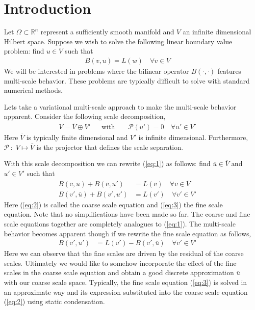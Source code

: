 \section{Introduction}
Let $\Omega \subset \mathbb{R}^n$ represent a sufficiently smooth manifold and $V$ an infinite dimensional Hilbert space. Suppose we wish to solve the following linear boundary value problem: find $u \in V$ such that
\begin{align}
	B(v, u) = L(w)	\quad \forall v \in V \label{eq:1}
\end{align}
We will be interested in problems where the bilinear operator $B(\cdot,\cdot)$ features multi-scale behavior. These problems are typically difficult to solve with standard numerical methods. 

Lets take a variational multi-scale approach to make the multi-scale behavior apparent. Consider the following scale decomposition,
\begin{align}
	&V = \overline{V} \oplus V'&    &\text{with } &       & \mathcal{P} (u') = 0  \quad \forall u' \in V'&
\end{align}
Here $\overline{V}$ is typically finite dimensional and $V'$ is infinite dimensional. Furthermore, $\mathcal{P} \: : \; V \mapsto \overline{V}$ is the projector that defines the scale separation.

With this scale decomposition we can rewrite (\ref{eq:1}) as follows: find $\overline{u} \in \overline{V}$ and $u' \in V'$ such that
\begin{align}
	 B(\overline{v}, \overline{u}) + B(\overline{v}, u')  &= L(\overline{v})	\quad \forall \overline{v} \in \overline{V} \label{eq:2} \\
	 B(v', \overline{u}) + B(v', u')  &= L(v')	     \quad \forall v' \in V' \label{eq:3}
\end{align}
Here (\ref{eq:2})  is called the coarse scale equation and (\ref{eq:3}) the fine scale equation. Note that no simplifications have been made so far. The coarse and fine scale equations together are completely analogues to (\ref{eq:1}). The multi-scale behavior becomes apparent though if we rewrite the fine scale equation as follows,
\begin{align*}
	B(v', u')  &= L(v') - B(v', \overline{u}) 	     \quad \forall v' \in V'
\end{align*}
Here we can observe that the fine scales are driven by the residual of the coarse scales. Ultimately we would like to somehow incorporate the effect of the fine scales in the coarse scale equation and obtain a good discrete approximation $\overline{u}$ with our coarse scale space. Typically, the fine scale equation (\ref{eq:3}) is solved in an approximate way and its expression substituted into the coarse scale equation  (\ref{eq:2}) using static condensation.

